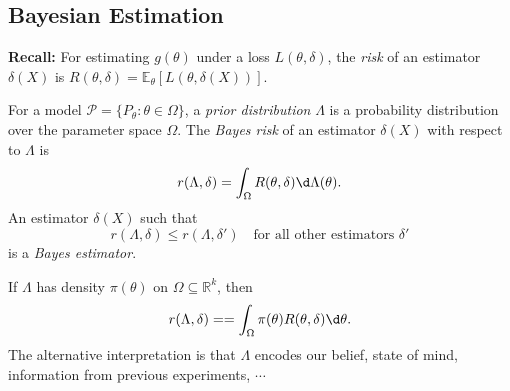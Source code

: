\documentclass[a4paper]{article}
\begin{document}
\subsection{Bayesian Estimation}
\textbf{Recall:} For estimating $g(\theta)$ under a loss $L(\theta,\delta)$, the \emph{risk} of an estimator $\delta(X)$ is $R(\theta,\delta) = \mathbb{E}_{\theta}[L(\theta,\delta(X))]$.

\begin{defi}
	For a model $\mathcal{P}=\{P_\theta:\theta \in \Omega\}$, a \emph{prior distribution} $\Lambda$ is a probability distribution over the parameter space $\Omega$. The \emph{Bayes risk} of an estimator $\delta(X)$ with respect to $\Lambda$ is 
	\begin{equation}
		r(\Lambda,\delta)=\int_{\Omega}R(\theta,\delta)\d \Lambda(\theta).
	\end{equation}
	An estimator $\delta(X)$ such that
	\begin{equation}
		r(\Lambda,\delta) \leq r(\Lambda,\delta') \quad \text{for all other estimators } \delta'
	\end{equation}
	is a \emph{Bayes estimator}.
\end{defi}

\begin{note}
	If $\Lambda$ has density $\pi (\theta)$ on $\Omega \subseteq \mathbb{R}^k$, then
	\begin{equation}
		r(\Lambda,\delta)==\int_{\Omega}\pi (\theta)R(\theta,\delta)\d \theta.
	\end{equation}
	The alternative interpretation is that $\Lambda$ encodes our belief, state of mind, information from previous experiments, $\cdots$
\end{note}
\end{document}
